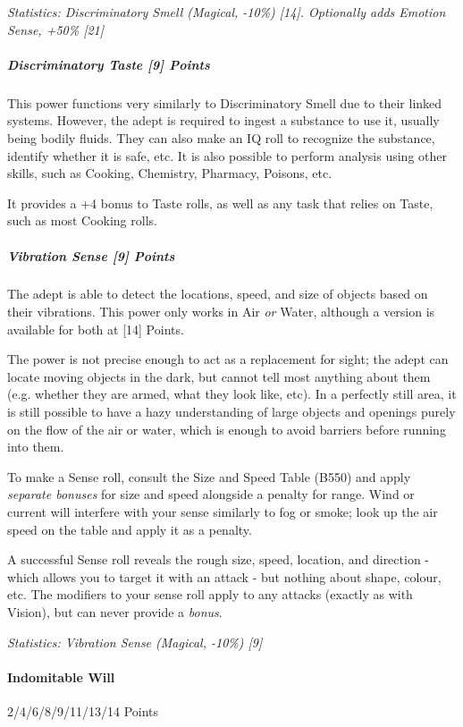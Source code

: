 \begin{multicols}{3}
		\textcolor{OliveGreen}{\textit{Statistics: Discriminatory Smell (Magical, -10\%) [14]. Optionally adds Emotion Sense, +50\% [21] }}	
		
	\subparagraph{Discriminatory Taste [9] Points}
	
		This power functions very similarly to Discriminatory Smell due to their linked systems. However, the adept is required to ingest a substance to use it, usually being bodily fluids. They can also make an IQ roll to recognize the substance, identify whether it is safe, etc. It is also possible to perform analysis using other skills, such as Cooking, Chemistry, Pharmacy, Poisons, etc.
		
		It provides a +4 bonus to Taste rolls, as well as any task that relies on Taste, such as most Cooking rolls.
		
	\subparagraph{Vibration Sense [9] Points}
	
		The adept is able to detect the locations, speed, and size of objects based on their vibrations. This power only works in Air \textit{or} Water, although a version is available for both at [14] Points.
		
		The power is not precise enough to act as a replacement for sight; the adept can locate moving objects in the dark, but cannot tell most anything about them (e.g. whether they are armed, what they look like, etc). In a perfectly still area, it is still possible to have a hazy understanding of large objects and openings purely on the flow of the air or water, which is enough to avoid barriers before running into them.
		
		To make a Sense roll, consult the Size and Speed Table (B550) and apply \textit{separate bonuses} for size and speed alongside a penalty for range. Wind or current will interfere with your sense similarly to fog or smoke; look up the air speed on the table and apply it as a penalty.
		
		A successful Sense roll reveals the rough size, speed, location, and direction - which allows you to target it with an attack - but nothing about shape, colour, etc. The modifiers to your sense roll apply to any attacks (exactly as with Vision), but can never provide a \textit{bonus}.  
	
		\textcolor{OliveGreen}{\textit{Statistics: Vibration Sense (Magical, -10\%) [9] }}
	
	\paragraph{Indomitable Will}
	\begin{flushright}
		2/4/6/8/9/11/13/14 Points
	\end{flushright}


\end{multicols}

